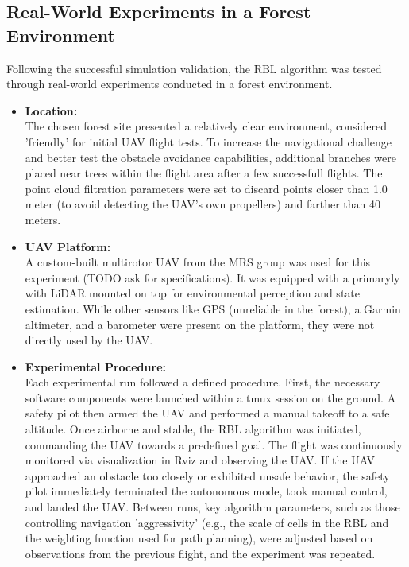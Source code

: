         \subsection{Real-World Experiments in a Forest Environment}
            Following the successful simulation validation, the \ac{RBL} algorithm was tested through real-world experiments conducted in a forest environment.
            \begin{itemize}
                \item \textbf{Location: } \\
                    The chosen forest site presented a relatively clear environment, considered 'friendly' for initial UAV flight tests. 
                    To increase the navigational challenge and better test the obstacle avoidance capabilities, additional branches were placed near trees within the flight area after a few successfull flights. 
                    The point cloud filtration parameters were set to discard points closer than 1.0 meter (to avoid detecting the \ac{UAV}'s own propellers) and farther than 40 meters.
                \item \textbf{UAV Platform: } \\
                    A custom-built multirotor UAV from the MRS group was used for this experiment (TODO ask for specifications). 
                    It was equipped with a primaryly with LiDAR mounted on top for environmental perception and state estimation.
                    While other sensors like GPS (unreliable in the forest), a Garmin altimeter, and a barometer were present on the platform, they were not directly used by the \ac{UAV}.
                \item \textbf{Experimental Procedure: } \\
                    Each experimental run followed a defined procedure. 
                    First, the necessary software components were launched within a tmux session on the ground. 
                    A safety pilot then armed the UAV and performed a manual takeoff to a safe altitude. 
                    Once airborne and stable, the \ac{RBL} algorithm was initiated, commanding the UAV towards a predefined goal. 
                    The flight was continuously monitored via visualization in Rviz and observing the \ac{UAV}. 
                    If the UAV approached an obstacle too closely or exhibited unsafe behavior, the safety pilot immediately terminated the autonomous mode, took manual control, and landed the UAV. 
                    Between runs, key algorithm parameters, such as those controlling navigation 'aggressivity' (e.g., the scale of cells in the RBL and the weighting function used for path planning), were adjusted based on observations from the previous flight, and the experiment was repeated.

\end{itemize}
